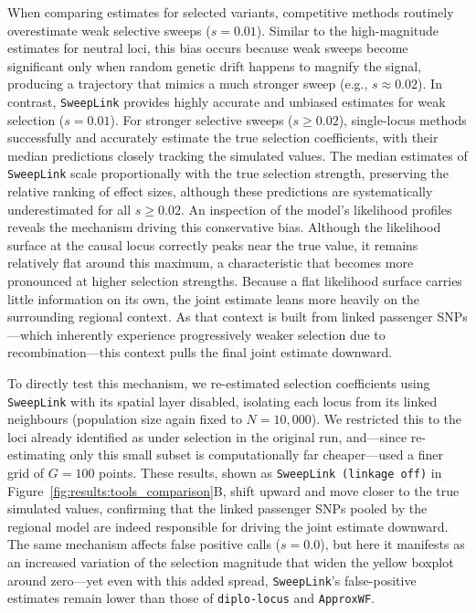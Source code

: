 \documentclass{article}
\newcommand{\SweepLink}{\texttt{SweepLink}\xspace}
\newcommand{\ApproxWF}{\texttt{ApproxWF}\xspace}
\newcommand{\diplolocus}{\texttt{diplo-locus}\xspace}
\begin{document}
When comparing estimates for selected variants, competitive methods routinely overestimate weak selective sweeps ($s=0.01$).
Similar to the high-magnitude estimates for neutral loci, this bias occurs because weak sweeps become significant only when random genetic drift happens to magnify the signal, producing a trajectory that mimics a much stronger sweep (e.g., $s \approx 0.02$).
In contrast, \SweepLink provides highly accurate and unbiased estimates for weak selection ($s=0.01$).
For stronger selective sweeps ($s \ge 0.02$), single-locus methods successfully and accurately estimate the true selection coefficients, with their median predictions closely tracking the simulated values.
The median estimates of \SweepLink scale proportionally with the true selection strength, preserving the relative ranking of effect sizes, although these predictions are systematically underestimated for all $s \ge 0.02$.
An inspection of the model's likelihood profiles reveals the mechanism driving this conservative bias.
Although the likelihood surface at the causal locus correctly peaks near the true value, it remains relatively flat around this maximum, a characteristic that becomes more pronounced at higher selection strengths.
Because a flat likelihood surface carries little information on its own, the joint estimate leans more heavily on the surrounding regional context.
As that context is built from linked passenger SNPs---which inherently experience progressively weaker selection due to recombination---this context pulls the final joint estimate downward.

To directly test this mechanism, we re-estimated selection coefficients using \SweepLink with its spatial layer disabled, isolating each locus from its linked neighbours (population size again fixed to $N=10{,}000$).
We restricted this to the loci already identified as under selection in the original run, and---since re-estimating only this small subset is computationally far cheaper---used a finer grid of $G=100$ points.
These results, shown as \SweepLink~\texttt{(linkage off)} in Figure~\ref{fig:results:tools_comparison}B, shift upward and move closer to the true simulated values, confirming that the linked passenger SNPs pooled by the regional model are indeed responsible for driving the joint estimate downward.
The same mechanism affects false positive calls ($s=0.0$), but here it manifests as an increased variation of the selection magnitude that widen the yellow boxplot around zero---yet even with this added spread, \SweepLink's false-positive estimates remain lower than those of \diplolocus and \ApproxWF.
\end{document}
